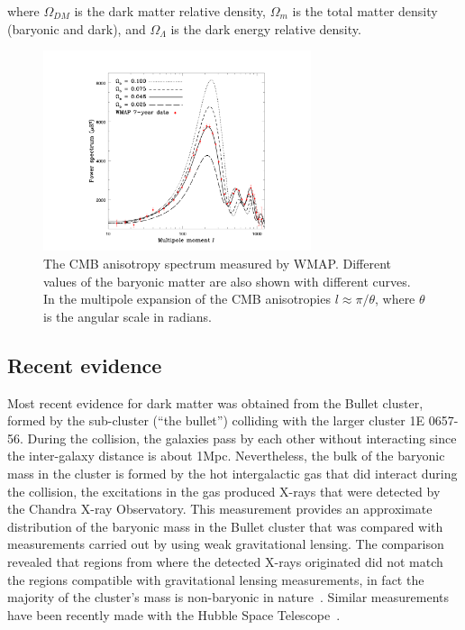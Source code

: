 where $\Omega_{DM}$ is the dark matter relative density, $\Omega_{m}$
is the total matter density (baryonic and dark), and
$\Omega_{\Lambda}$ is the dark energy relative density.
\begin{figure}
 \centering
\includegraphics[width=0.7\textwidth]{IntroFigures/CMB_Multipole.pdf}
\caption{The CMB anisotropy spectrum measured by WMAP. Different
  values of the baryonic matter are also shown with different
  curves. In the multipole expansion of the CMB anisotropies
  $l\approx\pi/\theta$, where $\theta$ is the angular scale in radians.\label{fig:CMBAnisotropies}}
\end{figure}
\subsection{Recent evidence}

Most recent evidence for dark matter was obtained from the Bullet
cluster, formed by the sub-cluster (``the bullet'') colliding with the
larger cluster 1E 0657-56. During the collision, the galaxies pass by
each other without interacting since the inter-galaxy distance is
about 1\unit{Mpc}. Nevertheless, the bulk of the baryonic mass in the cluster is
formed by the hot intergalactic gas that did interact during the
collision, the excitations in the gas produced X-rays that were
detected by the Chandra X-ray Observatory. This measurement provides
an approximate distribution of the baryonic mass in the Bullet cluster
that was compared with measurements carried out by using weak
gravitational lensing. The comparison revealed that regions from
where the detected X-rays originated did not match the regions
compatible with gravitational lensing measurements, in fact the
majority of the cluster's mass is non-baryonic in nature~\cite{bullet}. Similar
measurements have been recently made with the Hubble Space Telescope~\cite{RingDM}.

